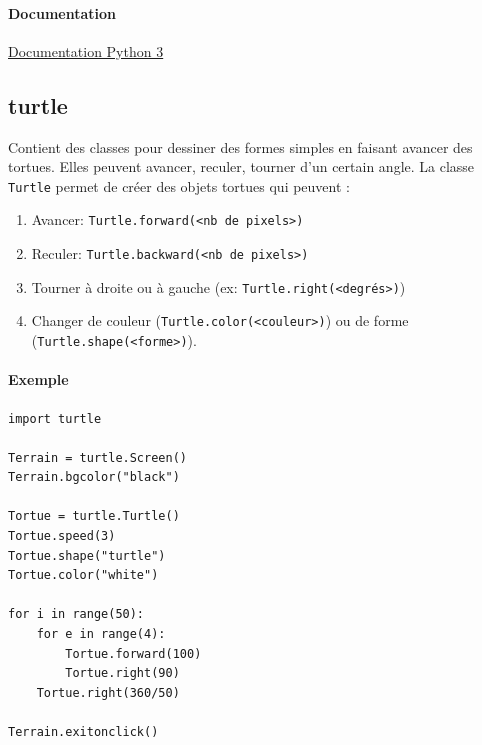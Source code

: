 \documentclass[a4paper, 10pt]{article}
\newcommand{\code}[1]{{\small\texttt{#1}}}
\begin{document}
\paragraph*{Documentation} \href{https://docs.python.org/fr/3/library/datetime.html}{Documentation Python 3}

\subsection{turtle}

Contient des classes pour dessiner des formes simples en faisant avancer des tortues. Elles peuvent avancer, reculer, tourner d'un certain angle.
La classe \code{Turtle} permet de créer des objets tortues qui peuvent :
\begin{enumerate}
        \item Avancer: \code{Turtle.forward(<nb de pixels>)}
        \item Reculer: \code{Turtle.backward(<nb de pixels>)}
        \item Tourner à droite ou à gauche (ex: \code{Turtle.right(<degrés>)})
        \item Changer de couleur (\code{Turtle.color(<couleur>)}) ou de forme (\code{Turtle.shape(<forme>)}).
\end{enumerate}

\paragraph{Exemple}
\begin{verbatim}
import turtle

Terrain = turtle.Screen()
Terrain.bgcolor("black")

Tortue = turtle.Turtle()
Tortue.speed(3)
Tortue.shape("turtle")
Tortue.color("white")

for i in range(50):
    for e in range(4):
        Tortue.forward(100)
        Tortue.right(90)
    Tortue.right(360/50)

Terrain.exitonclick()
\end{verbatim}
\end{document}
